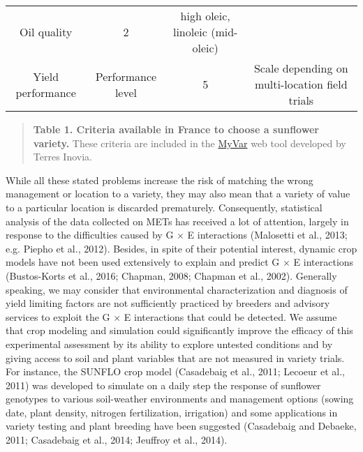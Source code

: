 \documentclass[a4paper]{article}
\begin{document}
\begin{longtable}[]{@{}cccc@{}}
\begin{minipage}[t]{0.28\columnwidth}
Oil quality\strut
\end{minipage} & \begin{minipage}[t]{0.09\columnwidth}\centering\strut
2\strut
\end{minipage} & \begin{minipage}[t]{0.29\columnwidth}\centering\strut
high oleic, linoleic (mid-oleic)\strut
\end{minipage}\tabularnewline
\begin{minipage}[t]{0.24\columnwidth}\centering\strut
Yield performance\strut
\end{minipage} & \begin{minipage}[t]{0.28\columnwidth}\centering\strut
Performance level\strut
\end{minipage} & \begin{minipage}[t]{0.09\columnwidth}\centering\strut
5\strut
\end{minipage} & \begin{minipage}[t]{0.29\columnwidth}\centering\strut
Scale depending on multi-location field trials\strut
\end{minipage}\tabularnewline
\bottomrule
\end{longtable}

\begin{quote}
\textbf{Table 1. Criteria available in France to choose a sunflower
variety.} These criteria are included in the
\href{http://www.myvar.fr}{MyVar} web tool developed by Terres Inovia.
\end{quote}

While all these stated problems increase the risk of matching the wrong
management or location to a variety, they may also mean that a variety
of value to a particular location is discarded prematurely.
Consequently, statistical analysis of the data collected on METs has
received a lot of attention, largely in response to the difficulties
caused by G \(\times\) E interactions (Malosetti et al., 2013; e.g.
Piepho et al., 2012). Besides, in spite of their potential interest,
dynamic crop models have not been used extensively to explain and
predict G \(\times\) E interactions (Bustos-Korts et al., 2016; Chapman,
2008; Chapman et al., 2002). Generally speaking, we may consider that
environmental characterization and diagnosis of yield limiting factors
are not sufficiently practiced by breeders and advisory services to
exploit the G \(\times\) E interactions that could be detected. We
assume that crop modeling and simulation could significantly improve the
efficacy of this experimental assessment by its ability to explore
untested conditions and by giving access to soil and plant variables
that are not measured in variety trials. For instance, the SUNFLO crop
model (Casadebaig et al., 2011; Lecoeur et al., 2011) was developed to
simulate on a daily step the response of sunflower genotypes to various
soil-weather environments and management options (sowing date, plant
density, nitrogen fertilization, irrigation) and some applications in
variety testing and plant breeding have been suggested (Casadebaig and
Debaeke, 2011; Casadebaig et al., 2014; Jeuffroy et al., 2014).
\end{document}
